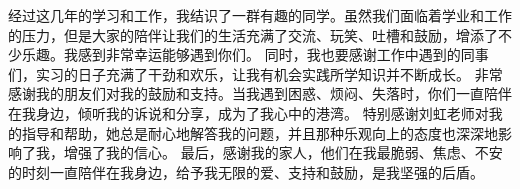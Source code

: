 \newpage
{\kaishu
  \begin{center}
    \LARGE\bfseries{}
  \end{center}

  经过这几年的学习和工作，我结识了一群有趣的同学。虽然我们面临着学业和工作的压力，但是大家的陪伴让我们的生活充满了交流、玩笑、吐槽和鼓励，增添了不少乐趣。我感到非常幸运能够遇到你们。
同时，我也要感谢工作中遇到的同事们，实习的日子充满了干劲和欢乐，让我有机会实践所学知识并不断成长。
非常感谢我的朋友们对我的鼓励和支持。当我遇到困惑、烦闷、失落时，你们一直陪伴在我身边，倾听我的诉说和分享，成为了我心中的港湾。
特别感谢刘虹老师对我的指导和帮助，她总是耐心地解答我的问题，并且那种乐观向上的态度也深深地影响了我，增强了我的信心。
最后，感谢我的家人，他们在我最脆弱、焦虑、不安的时刻一直陪伴在我身边，给予我无限的爱、支持和鼓励，是我坚强的后盾。

} 